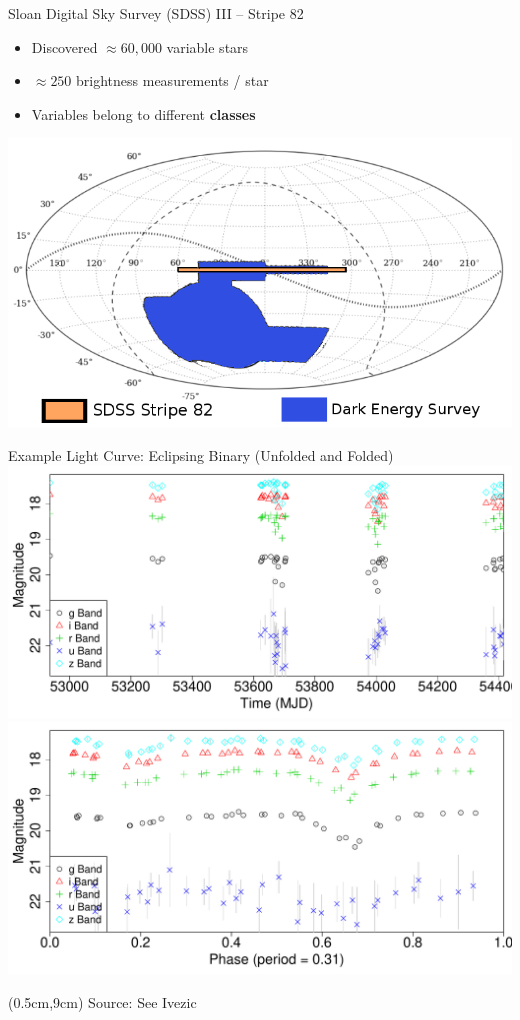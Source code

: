 \documentclass[12pt]{beamer}
\newcommand{\att}[1]{\begin{textblock*}{12cm}(0.5cm,9cm) %
  {\tiny Source: #1}
      \end{textblock*}}
\begin{document}
\begin{frame}{Sloan Digital Sky Survey (SDSS) III -- Stripe 82}
\begin{itemize}
\item Discovered $\approx 60,000$ variable stars
\item $\approx 250$ brightness measurements / star
\item Variables belong to different \textbf{classes}
\end{itemize}


  \begin{center}
    \includegraphics[scale=0.2]{figs/des_observing_strategy.png}
    \end{center}


\begin{center}
Example Light Curve: Eclipsing Binary (Unfolded and Folded)\\
\includegraphics[scale=.15]{figs/unfolded_4183016.pdf}
\includegraphics[scale=.15]{figs/folded_4183016.pdf}
\end{center}

\att{See Ivezic \cite{ivezic2007sloan}}

\end{frame}
\end{document}
